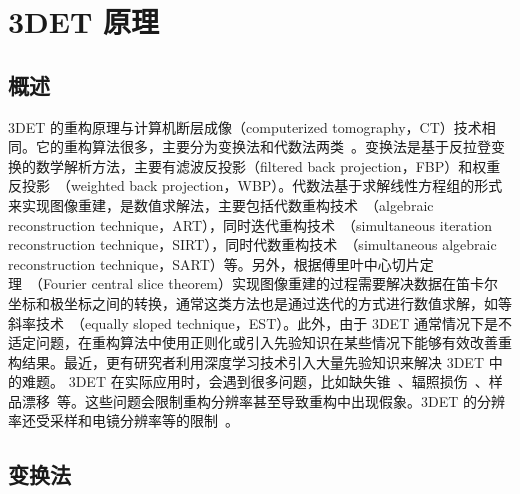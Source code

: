 \section{3DET 原理}
\subsection{概述}
3DET 的重构原理与计算机断层成像（computerized tomography，CT）技术相同。它的重构算法很多，主要分为变换法和代数法两类~\cite{Kak1988}。变换法是基于反拉登变换的数学解析方法，主要有滤波反投影（filtered back projection，FBP）和权重反投影~\cite{Liu2016,Cho1994}（weighted back projection，WBP）。代数法基于求解线性方程组的形式来实现图像重建，是数值求解法，主要包括代数重构技术~\cite{Gordon1970}（algebraic reconstruction technique，ART），同时迭代重构技术~\cite{Gregor2008,Okariz2017}（simultaneous iteration reconstruction technique，SIRT），同时代数重构技术~\cite{Jiang2003,Andersen1984}（simultaneous algebraic reconstruction technique，SART）等。另外，根据傅里叶中心切片定理~\cite{Garces2011,Bracewell1990}（Fourier central slice theorem）实现图像重建的过程需要解决数据在笛卡尔坐标和极坐标之间的转换，通常这类方法也是通过迭代的方式进行数值求解，如等斜率技术~\cite{Xu2015,Scott2012,Lee2008,Miao2005,Mao2010}（equally sloped technique，EST）。此外，由于 3DET 通常情况下是不适定问题，在重构算法中使用正则化或引入先验知识在某些情况下能够有效改善重构结果。最近，更有研究者利用深度学习技术引入大量先验知识来解决 3DET 中的难题。
3DET 在实际应用时，会遇到很多问题，比如缺失锥~\cite{Persson2001,Lu2010,Aganj2007,Paavolainen2014,Yau1996,Trampert2016,Kovacik2014,Kupsch2015}、辐照损伤~\cite{Lee2008}、样品漂移~\cite{Ress1999,Jones2013,Diez2006,Printemps2016}等。这些问题会限制重构分辨率甚至导致重构中出现假象。3DET 的分辨率还受采样和电镜分辨率等的限制~\cite{Hovden2014}。
\subsection{变换法}
